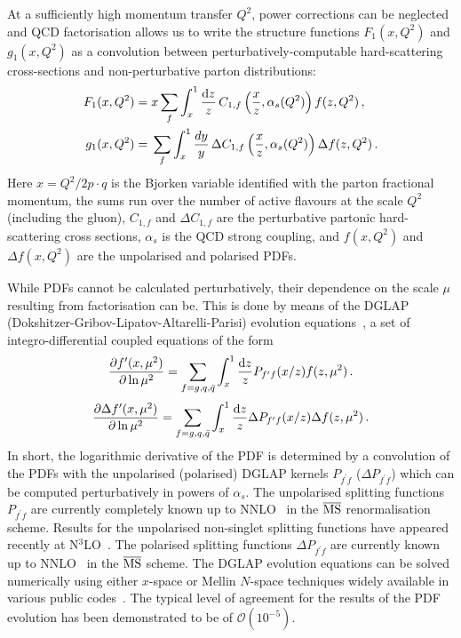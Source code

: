 At a sufficiently high momentum transfer $Q^2$, power corrections can be 
neglected and
QCD factorisation allows us to write the structure functions 
$F_1(x,Q^2)$ and $g_1(x,Q^2)$ as a convolution between perturbatively-computable
hard-scattering cross-sections and non-perturbative parton distributions:
\begin{align}
F_1(x,Q^2) 
= {} 
& x\sum_f \int_x^1 \frac{{\rm d}z}{z}\,C_{1,f}\left(\frac{x}{z},\alpha_s(Q^2)\right)f(z,Q^2) \,, \label{eq:Fi}\\
g_1(x,Q^2) 
= {} 
& \sum_f \int_x^1\frac{dy}{y}\, \Delta C_{1,f}\left(\frac{x}{z},\alpha_s(Q^2)\right) \Delta f(z,Q^2) \,.
\label{pdf}
\end{align}
%
Here $x=Q^2/2p\cdot q$ is the Bjorken variable identified with the parton
fractional momentum, the sums run over the number of active
flavours at the scale $Q^2$ (including the gluon), $C_{1,f}$ and 
$\Delta C_{1,f}$ are the perturbative partonic hard-scattering cross sections,
$\alpha_s$ is the QCD strong coupling, and $f(x,Q^2)$ and $\Delta f(x,Q^2)$ 
are the unpolarised and polarised PDFs.

While PDFs cannot be calculated perturbatively, their dependence on the scale 
$\mu$ resulting from factorisation can be.
%
This is done by means of the
DGLAP (Dokshitzer-Gribov-Lipatov-Altarelli-Parisi) 
evolution equations~\cite{Dokshitzer:1977sg,Gribov:1972ri,Altarelli:1977zs},
a set of integro-differential coupled equations of the form
\begin{equation}
  \label{eq:dglap}
\frac{\partial f^\prime(x,\mu^2)}{\partial \ln \mu^2}
=
\sum_{f=g,q,\bar{q}}\int_x^1 
\frac{{\rm d}z}{z}P_{f^\prime f}(x/z)f(z,\mu^2)\, .
\end{equation}
%
\begin{equation}
  \label{eq:dglap}
\frac{\partial \Delta f^\prime(x,\mu^2)}{\partial \ln \mu^2}
=
\sum_{f=g,q,\bar{q}}\int_x^1 
\frac{{\rm d}z}{z}\Delta P_{f^\prime f}(x/z)\Delta f(z,\mu^2)\, .
\end{equation}
%
In short, the logarithmic derivative of the PDF is determined by a convolution
of the PDFs with the unpolarised (polarised) DGLAP kernels $P_{f^\prime f}$
($\Delta P_{f^\prime f}$) which can be 
computed perturbatively in powers of $\alpha_{s}$.
%
The unpolarised splitting functions $P_{f^\prime f}$ are currently completely known up  
to NNLO~\cite{mvvns,Vogt:2004mw} in the $\overline{\rm MS}$ 
renormalisation scheme.
%
Results for the unpolarised non-singlet splitting functions have appeared 
recently at N$^3$LO~\cite{Davies:2016jie,Moch:2017uml}.
%
The polarised splitting functions $\Delta P_{f^\prime f}$ are currently known 
up to  NNLO~\cite{Moch:2014sna} in the $\overline{\rm MS}$ scheme.
%
The DGLAP evolution equations can be solved numerically using
either $x$-space or Mellin $N$-space techniques widely available in various
public codes~\cite{Vogt:2004ns,Salam:2008qg,Botje:2010ay,
Bertone:2013vaa,Bertone:2015cwa}.
%
The typical level of agreement for the results of the PDF evolution 
has been demonstrated to be of $\mathcal{O}(10^{-5})$.


